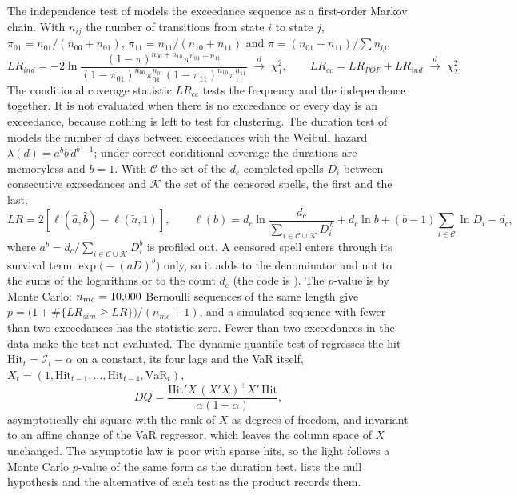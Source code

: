The independence test of \citet{market:christoffersen1998} models the exceedance sequence as a first-order Markov chain. With $n_{ij}$ the number of
transitions from state $i$ to state $j$, $\pi_{01}=n_{01}/(n_{00}+n_{01})$, $\pi_{11}=n_{11}/(n_{10}+n_{11})$ and
$\pi=(n_{01}+n_{11})/\sum n_{ij}$,
\begin{equation}
LR_{ind}=-2\ln\frac{(1-\pi)^{n_{00}+n_{10}}\pi^{n_{01}+n_{11}}}{(1-\pi_{01})^{n_{00}}\pi_{01}^{n_{01}}(1-\pi_{11})^{n_{10}}\pi_{11}^{n_{11}}}\;\overset{d}{\longrightarrow}\;\chi^2_1,
\qquad LR_{cc}=LR_{POF}+LR_{ind}\;\overset{d}{\longrightarrow}\;\chi^2_2.
\label{eq:mk-ind}
\end{equation}
The conditional coverage statistic $LR_{cc}$ tests the frequency and the independence together. It is not evaluated when there is no
exceedance or every day is an exceedance, because nothing is left to test for clustering. The duration test of
\citet{market:christoffersenpelletier2004} models the number of days between exceedances with the Weibull hazard $\lambda(d)=a^bb\,d^{b-1}$; under
correct conditional coverage the durations are memoryless and $b=1$. With $\mathcal C$ the set of the $d_c$ completed spells $D_i$ between consecutive
exceedances and $\mathcal K$ the set of the censored spells, the first and the last,
\begin{equation}
LR=2\left[\ell(\widehat a,\widehat b)-\ell(\widetilde a,1)\right],\qquad
\ell(b)=d_c\ln\frac{d_c}{\sum_{i\in\mathcal C\cup\mathcal K}D_i^{\,b}}+d_c\ln b+(b-1)\sum_{i\in\mathcal C}\ln D_i-d_c,
\label{eq:mk-dur}
\end{equation}
where $a^b=d_c/\sum_{i\in\mathcal C\cup\mathcal K}D_i^b$ is profiled out. A censored spell enters through its survival term $\exp\!\big(-(aD)^b\big)$ only, so it adds to the
denominator and not to the sums of the logarithms or to the count $d_c$ (the code is ). The $p$-value is by Monte Carlo: $n_{mc}=10{,}000{}$ Bernoulli sequences of the same length give
$p=\big(1+\#\{LR_{sim}\ge LR\}\big)/(n_{mc}+1)$, and a simulated sequence with fewer than two exceedances has the statistic zero. Fewer than two
exceedances in the data make the test not evaluated. The dynamic quantile test of \citet{market:engleManganelli2004} regresses the hit
$\mathrm{Hit}_t=\mathcal I_t-\alpha$ on a constant, its four lags and the VaR itself, $X_t=(1,\mathrm{Hit}_{t-1},\dots,\mathrm{Hit}_{t-4},\mathrm{VaR}_t)$,
\begin{equation}
DQ=\frac{\mathrm{Hit}'X\,(X'X)^{+}X'\,\mathrm{Hit}}{\alpha(1-\alpha)},
\label{eq:mk-dq}
\end{equation}
asymptotically chi-square with the rank of $X$ as degrees of freedom, and invariant to an affine change of the VaR regressor, which leaves the column space of $X$ unchanged. The asymptotic law is poor with sparse hits,
so the light follows a Monte Carlo $p$-value of the same form as the duration test.  lists the null hypothesis and the
alternative of each test as the product records them.

